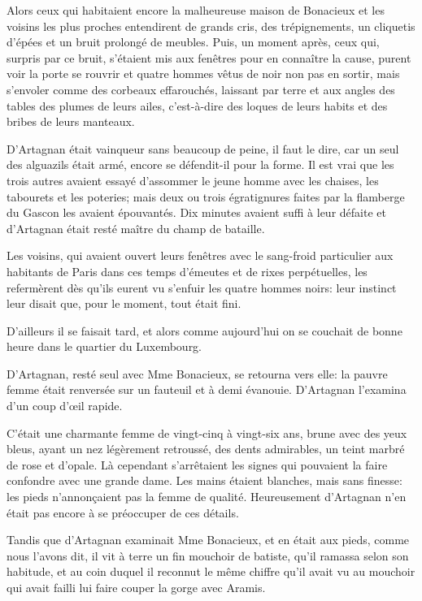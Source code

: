 Alors ceux qui habitaient encore la malheureuse maison de Bonacieux et les voisins les plus proches entendirent de grands cris, des trépignements, un cliquetis d'épées et un bruit prolongé de meubles. Puis, un moment après, ceux qui, surpris par ce bruit, s'étaient mis aux fenêtres pour en connaître la cause, purent voir la porte se rouvrir et quatre hommes vêtus de noir non pas en sortir, mais s'envoler comme des corbeaux effarouchés, laissant par terre et aux angles des tables des plumes de leurs ailes, c'est-à-dire des loques de leurs habits et des bribes de leurs manteaux. 

D'Artagnan était vainqueur sans beaucoup de peine, il faut le dire, car un seul des alguazils était armé, encore se défendit-il pour la forme. Il est vrai que les trois autres avaient essayé d'assommer le jeune homme avec les chaises, les tabourets et les poteries; mais deux ou trois égratignures faites par la flamberge du Gascon les avaient épouvantés. Dix minutes avaient suffi à leur défaite et d'Artagnan était resté maître du champ de bataille. 

Les voisins, qui avaient ouvert leurs fenêtres avec le sang-froid particulier aux habitants de Paris dans ces temps d'émeutes et de rixes perpétuelles, les refermèrent dès qu'ils eurent vu s'enfuir les quatre hommes noirs: leur instinct leur disait que, pour le moment, tout était fini. 

D'ailleurs il se faisait tard, et alors comme aujourd'hui on se couchait de bonne heure dans le quartier du Luxembourg. 

D'Artagnan, resté seul avec Mme Bonacieux, se retourna vers elle: la pauvre femme était renversée sur un fauteuil et à demi évanouie. D'Artagnan l'examina d'un coup d'œil rapide. 

C'était une charmante femme de vingt-cinq à vingt-six ans, brune avec des yeux bleus, ayant un nez légèrement retroussé, des dents admirables, un teint marbré de rose et d'opale. Là cependant s'arrêtaient les signes qui pouvaient la faire confondre avec une grande dame. Les mains étaient blanches, mais sans finesse: les pieds n'annonçaient pas la femme de qualité. Heureusement d'Artagnan n'en était pas encore à se préoccuper de ces détails. 

Tandis que d'Artagnan examinait Mme Bonacieux, et en était aux pieds, comme nous l'avons dit, il vit à terre un fin mouchoir de batiste, qu'il ramassa selon son habitude, et au coin duquel il reconnut le même chiffre qu'il avait vu au mouchoir qui avait failli lui faire couper la gorge avec Aramis. 

